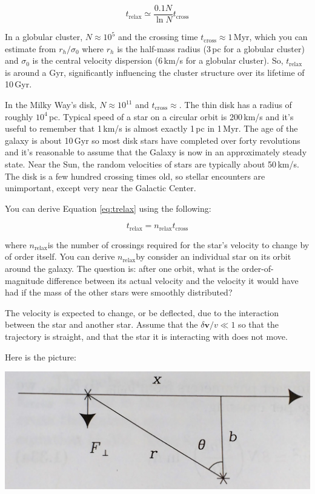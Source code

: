 \documentclass[12pt, letterpaper, preprint]{aastex}
\newcommand{\trelax}{\mbox{$t_\mathrm{relax}$}}
\newcommand{\nrelax}{\mbox{$n_\mathrm{relax}$}}
\newcommand{\tcross}{\mbox{$t_\mathrm{cross}$}}
\begin{document}
\begin{enumerate}
\begin{equation}
\trelax \simeq \frac{0.1N}{\ln N} \tcross
\label{eq:trelax}
\end{equation}

In a globular cluster, $N \approx 10^5$ and the crossing time $\tcross \approx 1\,$Myr, which you can estimate from $r_h/\sigma_0$ where $r_h$ is the half-mass radius (3\,pc for a globular cluster) and $\sigma_0$ is the central velocity dispersion (6\,km/s for a globular cluster).
So, $\trelax$ is around a Gyr, significantly influencing the cluster structure over its lifetime of 10\,Gyr. 

In the Milky Way's disk, $N \approx 10^{11}$ and $\tcross \approx $. The thin disk has a radius of roughly $10^4\,$pc. Typical speed of a star on a circular orbit is 200\,km/s and it's useful to remember that 1\,km/s is almost exactly 1\,pc in 1\,Myr. The age of the galaxy is about 10\,Gyr so most disk stars have completed over forty revolutions and it's reasonable to assume that the Galaxy is now in an approximately steady state. Near the Sun, the random velocities of stars are typically about 50\,km/s. 
The disk is a few hundred crossing times old, so stellar encounters are unimportant, except very near the Galactic Center. 

You can derive Equation \ref{eq:trelax} using the following:

$$\trelax = \nrelax \tcross$$

where \nrelax is the number of crossings required for the star's velocity to change by of order itself. You can derive \nrelax by consider an individual star on its orbit around the galaxy. The question is: after one orbit, 
what is the order-of-magnitude difference between its actual velocity
and the velocity it would have had if the mass of the other stars were smoothly distributed? 

The velocity is expected to change, or be deflected, due to the interaction between the star and another star. Assume that the $\delta \mathbf{v}/v \ll 1$ so that the trajectory is straight, and that the star it is interacting with does not move. 

Here is the picture:

\includegraphics[scale=0.2]{2body-encounter.jpg}


\end{enumerate}
\end{document}
